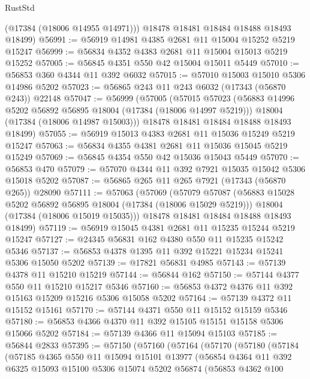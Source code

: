 \begin{lexlean}{RustStd}
\begin{coremodule}
        (@17384 (@18006 @14955 @14971)))
      @18478
      @18481
      @18484
      @18488
      @18493
      @18499)
@56991 := @56919 @14981 @4385 @2681 @11 @15004 @15252 @5219 @15247
@56999 := @56834 @4352 @4383 @2681 @11 @15004 @15013 @5219 @15252
@57005 := @56845 @4351 @550 @42 @15004 @15011 @5449
@57010 := @56853 @360 @4344 @11 @392 @6032
@57015 := @57010 @15003 @15010 @5306 @14986 @5202
@57023 := @56865 @243 @11 @243 @6032 (@17343 (@56870 @243)) @22148
@57047 := @56999
    (@57005
      (@57015
        @57023
        (@56883 @14996 @5202 @56892 @56895 @18004 (@17384 (@18006 @14997 @5219)))
        @18004
        (@17384 (@18006 @14987 @15003)))
      @18478
      @18481
      @18484
      @18488
      @18493
      @18499)
@57055 := @56919 @15013 @4383 @2681 @11 @15036 @15249 @5219 @15247
@57063 := @56834 @4355 @4381 @2681 @11 @15036 @15045 @5219 @15249
@57069 := @56845 @4354 @550 @42 @15036 @15043 @5449
@57070 := @56853 @470
@57079 := @57070 @4344 @11 @392 @7921 @15035 @15042 @5306 @15018 @5202
@57087 := @56865 @265 @11 @265 @7921 (@17343 (@56870 @265)) @28090
@57111 := @57063
    (@57069
      (@57079
        @57087
        (@56883 @15028 @5202 @56892 @56895 @18004 (@17384 (@18006 @15029 @5219)))
        @18004
        (@17384 (@18006 @15019 @15035)))
      @18478
      @18481
      @18484
      @18488
      @18493
      @18499)
@57119 := @56919 @15045 @4381 @2681 @11 @15235 @15244 @5219 @15247
@57127 := @24345 @56831 @162 @4380 @550 @11 @15235 @15242 @5346
@57137 := @56853 @4378 @1395 @11 @392 @15221 @15234 @15241 @5306 @15050 @5202
@57139 := @17821 @56831 @4985
@57143 := @57139 @4378 @11 @15210 @15219
@57144 := @56844 @162
@57150 := @57144 @4377 @550 @11 @15210 @15217 @5346
@57160 := @56853 @4372 @4376 @11 @392 @15163 @15209 @15216 @5306 @15058 @5202
@57164 := @57139 @4372 @11 @15152 @15161
@57170 := @57144 @4371 @550 @11 @15152 @15159 @5346
@57180 := @56853 @4366 @4370 @11 @392 @15105 @15151 @15158 @5306 @15066 @5202
@57184 := @57139 @4366 @11 @15094 @15103
@57185 := @56844 @2833
@57395 := @57150
    (@57160
      (@57164
        (@57170
          (@57180
            (@57184
              (@57185
                @4365
                @550
                @11
                @15094
                @15101
                @13977
                (@56854
                  @4364
                  @11
                  @392
                  @6325
                  @15093
                  @15100
                  @5306
                  @15074
                  @5202
                  @56874
                  (@56853
                    @4362
                    @100

\end{coremodule}
\end{lexlean}
